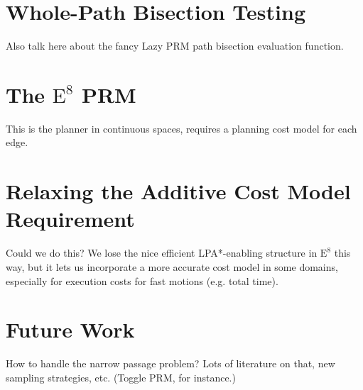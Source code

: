 \section{Whole-Path Bisection Testing}

Also talk here about the fancy Lazy PRM path bisection
evaluation function.

\section{The $\mbox{E}^8$ PRM}

This is the planner in continuous spaces,
requires a planning cost model for each edge.

\section{Relaxing the Additive Cost Model Requirement}

Could we do this?
We lose the nice efficient LPA*-enabling structure in
$\mbox{E}^8$ this way,
but it lets us incorporate a more accurate cost model in some domains,
especially for execution costs for fast motions (e.g. total time).

\section{Future Work}

How to handle the narrow passage problem?
Lots of literature on that, new sampling strategies, etc.
(Toggle PRM, for instance.)
